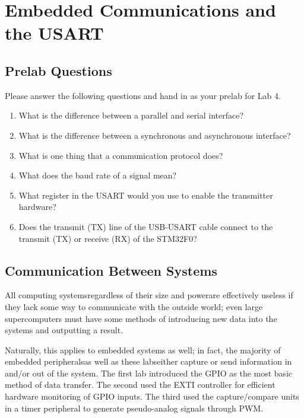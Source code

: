 \documentclass[openany,11pt,fleqn]{book} %
\begin{document}
	
\chapter{Embedded Communications and the USART}

\section{\color{blue}Prelab Questions}
\begin{question}[Prelab 4]
	Please answer the following questions and hand in as your prelab for Lab 4.
	\begin{enumerate}
		\item What is the difference between a parallel and serial interface?
		\item What is the difference between a synchronous and asynchronous interface?
		\item What is one thing that a communication protocol does?
		\item What does the baud rate of a signal mean?
		\item What register in the USART would you use to enable the transmitter hardware?
		\item Does the transmit (TX) line of the USB-USART cable connect to the transmit (TX) or receive (RX) of the STM32F0?
	\end{enumerate}
\end{question}

\section{Communication Between Systems}
All computing systems\textemdash regardless of their size and power\textemdash are effectively useless if they lack some way to communicate with the outside world; even large supercomputers must have some methods of introducing new data into the systems and outputting a result. 

Naturally, this applies to embedded systems as well; in fact, the majority of embedded peripherals\textemdash as well as these labs\textemdash either capture or send information in and/or out of the system. The first lab introduced the GPIO as the most basic method of data transfer. The second used the EXTI controller for efficient hardware monitoring of GPIO inputs. The third used the capture/compare units in a timer peripheral to generate pseudo-analog signals through PWM. 
\end{document}
